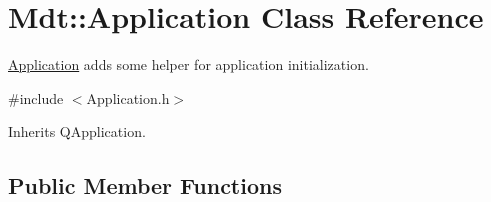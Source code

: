 \hypertarget{class_mdt_1_1_application}{}\section{Mdt\+:\+:Application Class Reference}
\label{class_mdt_1_1_application}


\hyperlink{class_mdt_1_1_application}{Application} adds some helper for application initialization.  




{\ttfamily \#include $<$Application.\+h$>$}



Inherits Q\+Application.

\subsection*{Public Member Functions}
